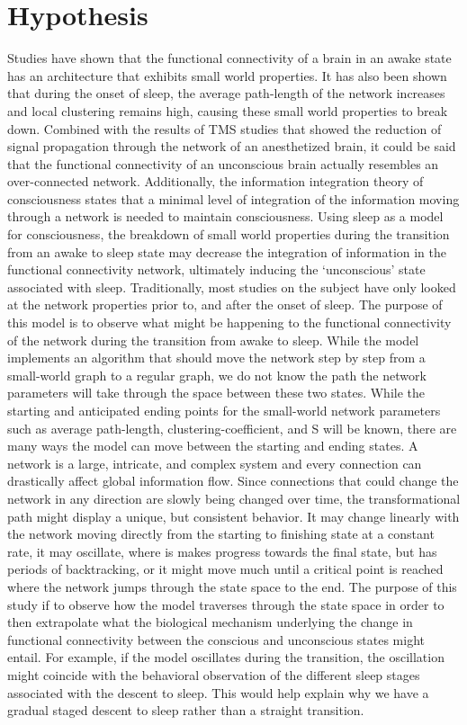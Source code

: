\documentclass[12pt,letterpaper]{report}
\begin{document}
\chapter{Hypothesis}
	Studies have shown that the functional connectivity of a brain in an awake state has an architecture that exhibits small world properties. It has also been shown that during the onset of sleep, the average path-length of the network increases and local clustering remains high, causing these small world properties to break down. Combined with the results of TMS studies that showed the reduction of signal propagation through the network of an anesthetized brain, it could be said that the functional connectivity of an unconscious brain actually resembles an over-connected network. Additionally, the information integration theory of consciousness states that a minimal level of integration of the information moving through a network is needed to maintain consciousness. Using sleep as a model for consciousness, the breakdown of small world properties during the transition from an awake to sleep state may decrease the integration of information in the functional connectivity network, ultimately inducing the ‘unconscious’ state associated with sleep.
	Traditionally, most studies on the subject have only looked at the network properties prior to, and after the onset of sleep. The purpose of this model is to observe what might be happening to the functional connectivity of the network during the transition from awake to sleep. While the model implements an algorithm that should move the network step by step from a small-world graph to a regular graph, we do not know the path the network parameters will take through the space between these two states. While the starting and anticipated ending points for the small-world network parameters such as average path-length, clustering-coefficient, and S will be known, there are many ways the model can move between the starting and ending states. A network is a large, intricate, and complex system and every connection can drastically affect global information flow. Since connections that could change the network in any direction are slowly being changed over time, the transformational path might display a unique, but consistent behavior. It may change linearly with the network moving directly from the starting to  finishing state at a constant rate, it may oscillate, where is makes progress towards the final state, but has periods of backtracking, or it might move much until a critical point is reached where the network jumps through the state space to the end. 
	The purpose of this study if to observe how the model traverses through the state space in order to then extrapolate what the biological mechanism underlying the change in functional  connectivity between the conscious and unconscious states might entail. For example, if the model oscillates during the transition, the oscillation might coincide with the behavioral observation of the different sleep stages associated with the descent to sleep. This would help explain why we have a gradual staged descent to sleep rather than a straight transition. 
\end{document}
